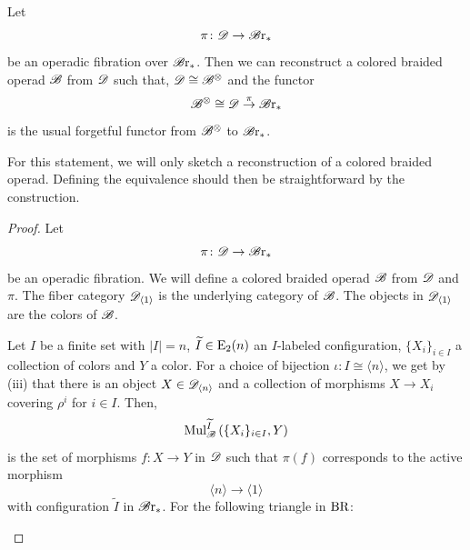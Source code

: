 \begin{prop}
    Let
    \[
        \pi \colon \mathscr{D} \to \mathscr{B} \text{r}_{\ast}
    \]
    be an operadic fibration over $\mathscr{B} \text{r}_{\ast}$. Then we can reconstruct a colored
    braided operad $\mathscr{B}$ from $\mathscr{D}$ such that, $\mathscr{D} \cong \mathscr{B}^{\otimes}$ and the functor
    \[
        \mathscr{B}^{\otimes} \cong \mathscr{D} \overset{\pi}{\to} \mathscr{B} \text{r}_{\ast}
    \]
    is the usual forgetful functor from $\mathscr{B}^{\otimes}$ to $\mathscr{B} \text{r}_{\ast}$.
\end{prop}
For this statement, we will only sketch a reconstruction of a colored braided
operad. Defining the equivalence should then be straightforward by the
construction.

\begin{proof}
    Let
    \[
        \pi \colon \mathscr{D} \to \mathscr{B} \text{r}_{\ast}
    \]
    be an operadic fibration. We will define a colored braided operad $\mathscr{B}$ from
    $\mathscr{D}$ and $\pi$. The fiber category $\mathscr{D}_{\langle 1 \rangle}$ is the
    underlying category of $\mathscr{B}$. The objects in $\mathscr{D}_{\langle 1 \rangle}$ are the
    colors of $\mathscr{B}$. 
    
    Let $I$ be a finite set with $|I|=n$, $\widetilde{I} \in \operatorname{E}_2(n)$ an
    $I$-labeled configuration, $\{X_i\}_{i \in I}$ a collection of colors and
    $Y$ a color. For a choice of bijection $\iota \colon I \cong \langle n
    \rangle$, we get by (iii) that there is an object $X \in \mathscr{D}_{\langle n
    \rangle}$ and a collection of morphisms $X \to X_i$ covering $\rho^i$ for $i
    \in I$. Then, 
    \[
        \operatorname{Mul}_{\mathscr{B}}^{\widetilde{I}}\left(\{X_i\}_{i \in I}, Y\right)
    \]
    is the set of morphisms $f \colon X \to Y$ in $\mathscr{D}$ such that $\pi(f)$
    corresponds to the active morphism
    \[
        \langle n \rangle \to \langle 1 \rangle
    \]
    with configuration $\widetilde{I}$ in $\mathscr{B} \text{r}_{\ast}$.
    For the following triangle in $\operatorname{BR}$:
            \begin{center}
\end{center}
\end{proof}
